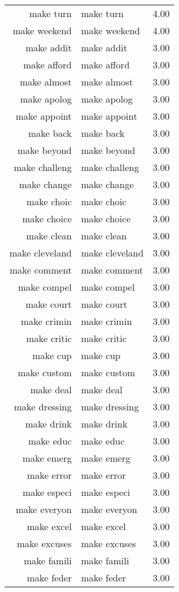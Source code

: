 \begin{table}[ht]
\begin{tabular}{rlr}
  make turn & make turn & 4.00 \\ 
  make weekend & make weekend & 4.00 \\ 
  make addit & make addit & 3.00 \\ 
  make afford & make afford & 3.00 \\ 
  make almost & make almost & 3.00 \\ 
  make apolog & make apolog & 3.00 \\ 
  make appoint & make appoint & 3.00 \\ 
  make back & make back & 3.00 \\ 
  make beyond & make beyond & 3.00 \\ 
  make challeng & make challeng & 3.00 \\ 
  make change & make change & 3.00 \\ 
  make choic & make choic & 3.00 \\ 
  make choice & make choice & 3.00 \\ 
  make clean & make clean & 3.00 \\ 
  make cleveland & make cleveland & 3.00 \\ 
  make comment & make comment & 3.00 \\ 
  make compel & make compel & 3.00 \\ 
  make court & make court & 3.00 \\ 
  make crimin & make crimin & 3.00 \\ 
  make critic & make critic & 3.00 \\ 
  make cup & make cup & 3.00 \\ 
  make custom & make custom & 3.00 \\ 
  make deal & make deal & 3.00 \\ 
  make dressing & make dressing & 3.00 \\ 
  make drink & make drink & 3.00 \\ 
  make educ & make educ & 3.00 \\ 
  make emerg & make emerg & 3.00 \\ 
  make error & make error & 3.00 \\ 
  make especi & make especi & 3.00 \\ 
  make everyon & make everyon & 3.00 \\ 
  make excel & make excel & 3.00 \\ 
  make excuses & make excuses & 3.00 \\ 
  make famili & make famili & 3.00 \\ 
  make feder & make feder & 3.00 \\ 

\end{tabular}
\end{table}
